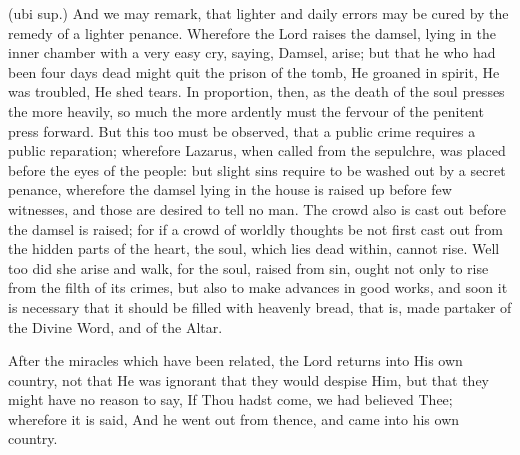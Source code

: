  (ubi sup.) And we may remark, that lighter and daily errors may be cured by the remedy of a lighter penance. Wherefore the Lord raises the damsel, lying in the inner chamber with a very easy cry, saying, Damsel, arise; but that he who had been four days dead might quit the prison of the tomb, He groaned in spirit, He was troubled, He shed tears. In proportion, then, as the death of the soul presses the more heavily, so much the more ardently must the fervour of the penitent press forward. But this too must be observed, that a public crime requires a public reparation; wherefore Lazarus, when called from the sepulchre, was placed before the eyes of the people: but slight sins require to be washed out by a secret penance, wherefore the damsel lying in the house is raised up before few witnesses, and those are desired to tell no man. The crowd also is cast out before the damsel is raised; for if a crowd of worldly thoughts be not first cast out from the hidden parts of the heart, the soul, which lies dead within, cannot rise. Well too did she arise and walk, for the soul, raised from sin, ought not only to rise from the filth of its crimes, but also to make advances in good works, and soon it is necessary that it should be filled with heavenly bread, that is, made partaker of the Divine Word, and of the Altar.


 

 After the miracles which have been related, the Lord returns into His own country, not that He was ignorant that they would despise Him, but that they might have no reason to say, If Thou hadst come, we had believed Thee; wherefore it is said, And he went out from thence, and came into his own country.

